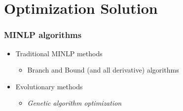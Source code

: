 \documentclass[handout]{beamer}
\begin{document}

\section{Optimization Solution}
\begin{frame}
	\frametitle{MINLP algorithms}
	\begin{itemize}
		\item Traditional MINLP methods
		\begin{itemize}
			\item Branch and Bound (and all derivative) algorithms
		\end{itemize}
		\item Evolutionary methods
		\begin{itemize}
			\item \emph{Genetic algorithm optimization}
		\end{itemize}
	\end{itemize}
\end{frame}

\end{document}
